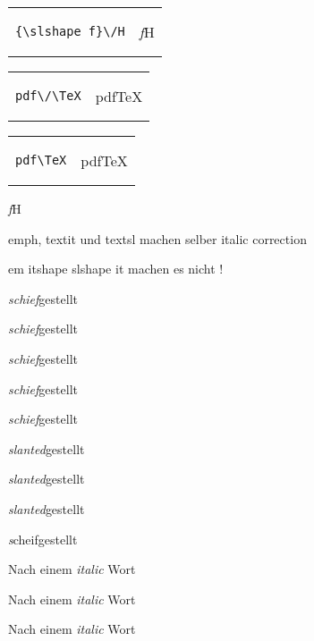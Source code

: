 \documentclass{article}
\begin{document}
\begin{tabular}[]{p{5cm}l}
\begin{minipage}{1cm}
\begin{verbatim}
{\slshape f}\/H
\end{verbatim}  
\end{minipage}
& 
\begin{minipage}{1cm}
{\slshape f}\/H
\end{minipage}
\end{tabular}

\begin{tabular}[]{p{5cm}l}
\begin{minipage}{1cm}
\begin{verbatim}
pdf\/\TeX
\end{verbatim}  
\end{minipage}
& 
\begin{minipage}{1cm}
pdf\/\TeX
\end{minipage}
\end{tabular}


\begin{tabular}[]{p{5cm}l}
\begin{minipage}{1cm}
\begin{verbatim}
pdf\TeX
\end{verbatim}  
\end{minipage}
& 
\begin{minipage}{1cm}
pdf\TeX
\end{minipage}
\end{tabular}





{\it f}H


emph, textit und textsl machen selber italic correction

em itshape slshape  it  machen es nicht !



\textit{schief}gestellt

\textit{schief}\/gestellt

{\it schief}gestellt



{\itshape schief}gestellt


{\itshape schief}\/gestellt

\textsl{slanted}gestellt

{\slshape slanted}gestellt

{\slshape slanted}\/gestellt


{\emph scheif}gestellt







\textsl{}





Nach einem \textit{italic} Wort

Nach einem \textit{italic}\/ Wort

Nach einem {\em italic} Wort
\end{document}
